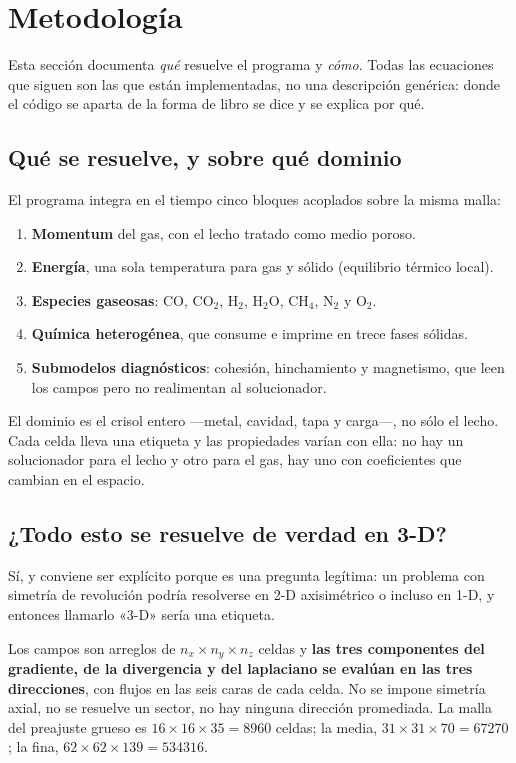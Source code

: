 \section{Metodología}
\label{sec:metodologia}

Esta sección documenta \emph{qué} resuelve el programa y \emph{cómo}. Todas las
ecuaciones que siguen son las que están implementadas, no una descripción
genérica: donde el código se aparta de la forma de libro se dice y se explica por
qué.

\subsection{Qué se resuelve, y sobre qué dominio}

El programa integra en el tiempo cinco bloques acoplados sobre la misma malla:

\begin{enumerate}[leftmargin=*,itemsep=2pt]
\item \textbf{Momentum} del gas, con el lecho tratado como medio poroso.
\item \textbf{Energía}, una sola temperatura para gas y sólido (equilibrio
térmico local).
\item \textbf{Especies gaseosas}: CO, CO$_2$, H$_2$, H$_2$O, CH$_4$, N$_2$ y
O$_2$.
\item \textbf{Química heterogénea}, que consume e imprime en trece fases
sólidas.
\item \textbf{Submodelos diagnósticos}: cohesión, hinchamiento y magnetismo, que
leen los campos pero no realimentan al solucionador.
\end{enumerate}

\noindent
El dominio es el crisol entero ---metal, cavidad, tapa y carga---, no sólo el
lecho. Cada celda lleva una etiqueta y las propiedades varían con ella: no hay
un solucionador para el lecho y otro para el gas, hay uno con coeficientes que
cambian en el espacio.

\subsection{¿Todo esto se resuelve de verdad en 3-D?}
\label{sec:es3d}

Sí, y conviene ser explícito porque es una pregunta legítima: un problema con
simetría de revolución podría resolverse en 2-D axisimétrico o incluso en 1-D, y
entonces llamarlo «3-D» sería una etiqueta.

\begin{clave}
Los campos son arreglos de $n_x \times n_y \times n_z$ celdas y \textbf{las tres
componentes del gradiente, de la divergencia y del laplaciano se evalúan en las
tres direcciones}, con flujos en las seis caras de cada celda. No se impone
simetría axial, no se resuelve un sector, no hay ninguna dirección promediada.
La malla del preajuste grueso es $16\times16\times35 = \num{8960}$ celdas; la
media, $31\times31\times70 = \num{67270}$; la fina,
$62\times62\times139 = \num{534316}$.
\end{clave}

